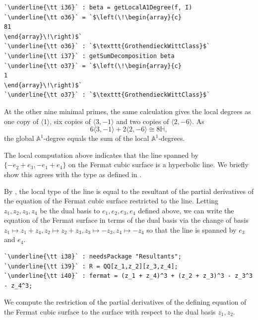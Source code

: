 \documentclass[12pt]{amsart}
\theoremstyle{definition}
\begin{document}
\begin{lstlisting}[language=Macaulay2output]
`\underline{\tt i36}` : beta = getLocalA1Degree(f, I)
`\underline{\tt o36}` = `$\left(\!\begin{array}{c}
81
\end{array}\!\right)$`
`\underline{\tt o36}` : `$\texttt{GrothendieckWittClass}$`
`\underline{\tt i37}` : getSumDecomposition beta
`\underline{\tt o37}` = `$\left(\!\begin{array}{c}
1
\end{array}\!\right)$`
`\underline{\tt o37}` : `$\texttt{GrothendieckWittClass}$`
\end{lstlisting}
At the other nine minimal primes, the same calculation gives the local degrees as one copy of $\langle 1\rangle$, six copies of $\langle 3, -1\rangle$ and two copies of $\langle2, -6\rangle$. As 
\[
6\langle3, -1\rangle+2\langle2,-6\rangle\cong 8\mathbb{H},
\]
the global $\mathbb{A}^1$-degree equals the sum of the local $\mathbb{A}^1$-degrees.

The local computation above indicates that the line spanned by $\{-e_{2}+e_{3},-e_{1}+e_{4}\}$ on the Fermat cubic surface is a hyperbolic line. We briefly show this agrees with the type as defined in \cite[Definition~9]{CubicKW}. 

By \cite[Proposition~14]{CubicKW}, the local type of the line is equal to the resultant of the partial derivatives of the equation of the Fermat cubic surface restricted to the line. Letting $z_{1},z_{2},z_{3},z_{4}$ be the dual basis to $e_{1},e_{2},e_{3},e_{4}$ defined above, we can write the equation of the Fermat surface in terms of the dual basis via the change of basis $z_{1}\mapsto z_{1}+z_{4}, z_{2}\mapsto z_{2}+z_{3}, z_{3}\mapsto -z_{3}, z_{4}\mapsto -z_{4}$ so that the line is spanned by $e_{3}$ and $e_{4}$. 

\begin{lstlisting}[language=Macaulay2output]
`\underline{\tt i38}` : needsPackage "Resultants";
`\underline{\tt i39}` : R = QQ[z_1,z_2][z_3,z_4];
`\underline{\tt i40}` : fermat = (z_1 + z_4)^3 + (z_2 + z_3)^3 - z_3^3 - z_4^3;
\end{lstlisting}
We compute the restriction of the partial derivatives of the defining equation of the Fermat cubic surface to the surface with respect to the dual basis $z_{1},z_{2}$. 
\end{document}
